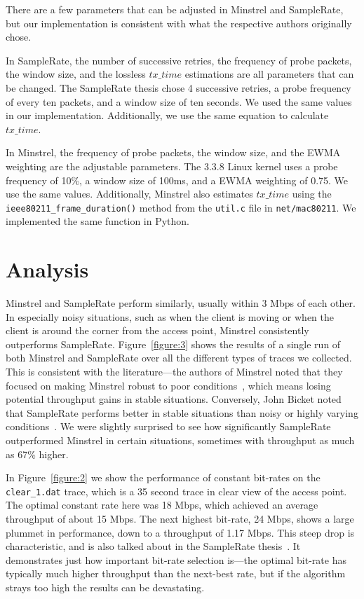 \documentclass[letterpaper,twocolumn,10pt]{article}
\begin{document}
There are a few parameters that can be adjusted in Minstrel and SampleRate, but our implementation is consistent with what the respective authors originally chose. 

In SampleRate, the number of successive retries, the frequency of probe packets, the window size, and the lossless $tx\_time$ estimations are all parameters that can be changed. The SampleRate thesis chose 4 successive retries, a probe frequency of every ten packets, and a window size of ten seconds. We used the same values in our implementation. Additionally, we use the same equation to calculate $tx\_time$.

In Minstrel, the frequency of probe packets, the window size, and the EWMA weighting are the adjustable parameters. The 3.3.8 Linux kernel uses a probe frequency of 10\%, a window size of 100ms, and a EWMA weighting of 0.75. We use the same values. Additionally, Minstrel also estimates $tx\_time$ using the \texttt{ieee80211\_frame\_duration()} method from the \texttt{util.c} file in \texttt{net/mac80211}. We implemented the same function in Python.

\section{Analysis}

Minstrel and SampleRate perform similarly, usually within 3 Mbps of each other. In especially noisy situations, such as when the client is moving or when the client is around the corner from the access point, Minstrel consistently outperforms SampleRate. Figure~\ref{figure:3} shows the results of a single run of both Minstrel and SampleRate over all the different types of traces we collected. This is consistent with the literature---the authors of Minstrel noted that they focused on making Minstrel robust to poor conditions~\cite{minstrel}, which means losing potential throughput gains in stable situations. Conversely, John Bicket noted that SampleRate performs better in stable situations than noisy or highly varying conditions~\cite{samplerate}. We were slightly surprised to see how significantly SampleRate outperformed Minstrel in certain situations, sometimes with throughput as much as 67\% higher. 

In Figure~\ref{figure:2} we show the performance of constant bit-rates on the \texttt{clear\_1.dat} trace, which is a 35 second trace in clear view of the access point. The optimal constant rate here was 18 Mbps, which achieved an average throughput of about 15 Mbps. The next highest bit-rate, 24 Mbps, shows a large plummet in performance, down to a throughput of 1.17 Mbps. This steep drop is characteristic, and is also talked about in the SampleRate thesis~\cite{samplerate}. It demonstrates just how important bit-rate selection is---the optimal bit-rate has typically much higher throughput than the next-best rate, but if the algorithm strays too high the results can be devastating. 
\end{document}
